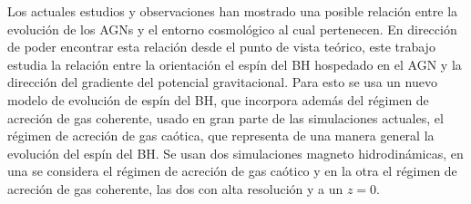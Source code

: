 

\begin{abstracts}






Los actuales estudios y observaciones han mostrado una posible relación entre la evolución de los AGNs y el entorno cosmológico al cual pertenecen. En dirección de poder encontrar esta relación desde el punto de vista teórico, este trabajo estudia la relación entre la orientación el espín del BH  hospedado en el AGN y la dirección del gradiente del potencial gravitacional. Para esto se usa un nuevo modelo de evolución de espín del BH, que incorpora además del régimen de acreción de gas coherente, usado en gran parte de las simulaciones actuales, el régimen de acreción de gas caótica, que representa de una manera general la evolución del espín del BH. Se usan dos simulaciones magneto hidrodinámicas, en una se considera el régimen de acreción de gas caótico y en la otra el régimen de acreción de gas coherente, las dos con alta resolución y a un  $z=0$. 


\end{abstracts}
